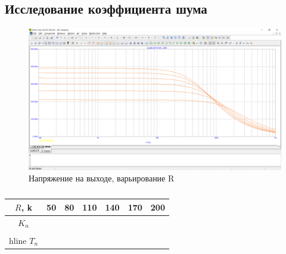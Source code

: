 \documentclass[a4paper, 12pt]{article}%
\begin{document}
\subsection{Исследование коэффициента шума}
\FloatBarrier
\begin{figure}
    \centering
    \includegraphics[scale = 0.4 \textwidth]{images/mod6_2_1.png}
    \caption{Напряжение на выходе, варьирование R}
    \label{fig:m621}
\end{figure}

\begin{table}[h!]
    \centering
    \begin{tabular}{|c|c|c|c|c|c|c|}
        $R$, k & 50 & 80 & 110 & 140 & 170 & 200\\ \hline
        $K_n$ & \\ \\hline
        $T_n$
    \end{tabular}
    \caption{}
    \label{tab:my_label}
\end{table}
\end{document}
